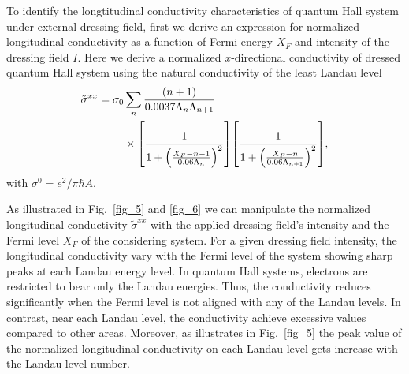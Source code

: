 
To identify the longtitudinal conductivity characteristics of quantum Hall system under external dressing field, first we derive an expression for normalized longitudinal conductivity as a function of Fermi energy $X_F$ and intensity of the dressing field $I$.
Here we derive a normalized $x$-directional conductivity of dressed quantum Hall system using the natural conductivity of the least Landau level
\begin{equation} \label{eq_35}
  \begin{aligned}
    \tilde{\sigma}^{xx} =
    \sigma_{0} &
    \sum_{n}
    \frac{\qty(n+1)}{0.0037\Lambda_n \Lambda_{n+1}} \\
    & \times
    \qty[
      \frac{1}
      {
        1 + \qty(\frac{X_F - n -1}{0.06\Lambda_n})^2
      }
    ]
    \qty[
      \frac{1}
      {
        1 + \qty(\frac{X_F - n}{0.06\Lambda_{n+1}})^2
      }
    ],
  \end{aligned}
\end{equation}
with $\sigma^0 = e^2/\pi \hbar A$.

As illustrated in Fig.~\ref{fig_5} and \ref{fig_6} we can manipulate the normalized longitudinal conductivity $\tilde{\sigma}^{xx}$ with the applied dressing field's intensity and the Fermi level $X_F$ of the considering system.
For a given dressing field intensity, the longitudinal conductivity vary with  the Fermi level of the system showing sharp peaks at each Landau energy level.
In quantum Hall systems, electrons are restricted to bear only the Landau energies. Thus, the conductivity reduces significantly when the Fermi level is not aligned with any of the Landau levels. In contrast, near each Landau level, the conductivity achieve excessive values compared to other areas. Moreover, as illustrates in Fig.~\ref{fig_5} the peak value of the normalized longitudinal conductivity on each Landau level gets increase with the Landau level number.

